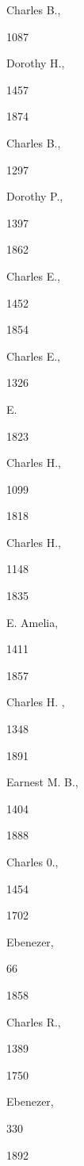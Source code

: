 \documentclass{book}
\begin{document}
Charles B., 


1087 




Dorothy H., 


1457 


1874 


Charles B., 


1297 




Dorothy P., 


1397 


1862 


Charles E., 


1452 








1854 


Charles E., 


1326 




E. 




1823 


Charles H., 


1099 








1818 


Charles H., 


1148 


1835 


E. Amelia, 


1411 


1857 


Charles H. , 


1348 


1891 


Earnest M. B., 


1404 


1888 


Charles 0., 


1454 


1702 


Ebenezer, 


66 


1858 


Charles R., 


1389 


1750 


Ebenezer, 


330 


1892 
\end{document}
